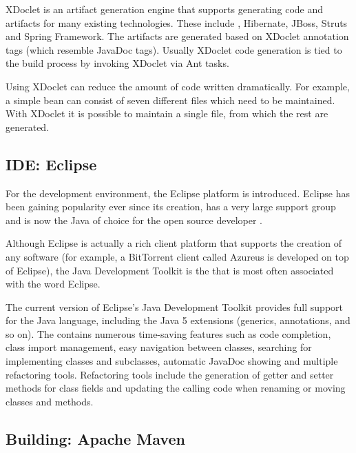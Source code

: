 XDoclet is an artifact generation engine that supports generating code 
and artifacts for many existing technologies. These include 
, Hibernate, JBoss, Struts and Spring Framework. The 
artifacts are generated based on XDoclet annotation tags (which 
resemble JavaDoc tags). Usually XDoclet code generation is tied to the 
build process by invoking XDoclet via Ant tasks.

Using XDoclet can reduce the amount of code written dramatically. For 
example, a simple  bean can consist of seven different 
files which need to be maintained. With XDoclet it is possible to 
maintain a single file, from which the rest are generated. 
\citep{xdoclet1}


\subsection{IDE: Eclipse}
\label{toc:oss:selected:eclipse}

For the development environment, the Eclipse platform \citep{eclipse} 
is introduced. Eclipse has been gaining popularity ever since its 
creation, has a very large support group and is now the Java 
 of choice for the open source developer 
\citep{rapidspring,eclipseide}.

Although Eclipse is actually a rich client platform that supports the 
creation of any software (for example, a BitTorrent client called 
Azureus is developed on top of Eclipse), the Java Development Toolkit 
is the  that is most often associated with the word 
Eclipse.

The current version of Eclipse's Java Development Toolkit provides 
full support for the Java language, including the Java 5 extensions 
(generics, annotations, and so on). The  contains numerous 
time-saving features such as code completion, class import management, 
easy navigation between classes, searching for implementing classes 
and subclasses, automatic JavaDoc showing and multiple refactoring 
tools. Refactoring tools include the generation of getter and setter 
methods for class fields and updating the calling code when renaming 
or moving classes and methods.



\subsection{Building: Apache Maven}
\label{toc:oss:selected:maven}


